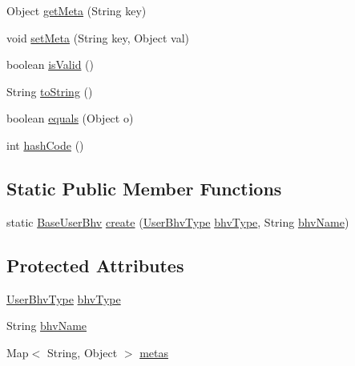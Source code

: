 \begin{DoxyCompactItemize}
\item 
\-Object \hyperlink{classlab_1_1davidahn_1_1appshuttle_1_1collect_1_1bhv_1_1_base_user_bhv_a084f908dad6936320d731dd78b77da02}{get\-Meta} (\-String key)
\item 
void \hyperlink{classlab_1_1davidahn_1_1appshuttle_1_1collect_1_1bhv_1_1_base_user_bhv_aa88c083a83fbd867da9f3ca5ef4ea007}{set\-Meta} (\-String key, \-Object val)
\item 
boolean \hyperlink{classlab_1_1davidahn_1_1appshuttle_1_1collect_1_1bhv_1_1_base_user_bhv_ab6813ac64ce1f0d009c892b5cac261d6}{is\-Valid} ()
\item 
\-String \hyperlink{classlab_1_1davidahn_1_1appshuttle_1_1collect_1_1bhv_1_1_base_user_bhv_a90459169f7d91b38afacf6daeb038c6b}{to\-String} ()
\item 
boolean \hyperlink{classlab_1_1davidahn_1_1appshuttle_1_1collect_1_1bhv_1_1_base_user_bhv_a842e471851fcc644832ca3f45eeb8994}{equals} (\-Object o)
\item 
int \hyperlink{classlab_1_1davidahn_1_1appshuttle_1_1collect_1_1bhv_1_1_base_user_bhv_a9025bf7cfb1aa4b4f12b5a82dc0b44b6}{hash\-Code} ()
\end{DoxyCompactItemize}
\subsection*{\-Static \-Public \-Member \-Functions}
\begin{DoxyCompactItemize}
\item 
static \hyperlink{classlab_1_1davidahn_1_1appshuttle_1_1collect_1_1bhv_1_1_base_user_bhv}{\-Base\-User\-Bhv} \hyperlink{classlab_1_1davidahn_1_1appshuttle_1_1collect_1_1bhv_1_1_base_user_bhv_a2b8ccb431e222ea8162e3ffaec88e5be}{create} (\hyperlink{enumlab_1_1davidahn_1_1appshuttle_1_1collect_1_1bhv_1_1_user_bhv_type}{\-User\-Bhv\-Type} \hyperlink{classlab_1_1davidahn_1_1appshuttle_1_1collect_1_1bhv_1_1_base_user_bhv_a29dae66ba4bf89a75849d77a35a57cb2}{bhv\-Type}, \-String \hyperlink{classlab_1_1davidahn_1_1appshuttle_1_1collect_1_1bhv_1_1_base_user_bhv_aa211c66df8abf7df665859d662891cc0}{bhv\-Name})
\end{DoxyCompactItemize}
\subsection*{\-Protected \-Attributes}
\begin{DoxyCompactItemize}
\item 
\hyperlink{enumlab_1_1davidahn_1_1appshuttle_1_1collect_1_1bhv_1_1_user_bhv_type}{\-User\-Bhv\-Type} \hyperlink{classlab_1_1davidahn_1_1appshuttle_1_1collect_1_1bhv_1_1_base_user_bhv_a29dae66ba4bf89a75849d77a35a57cb2}{bhv\-Type}
\item 
\-String \hyperlink{classlab_1_1davidahn_1_1appshuttle_1_1collect_1_1bhv_1_1_base_user_bhv_aa211c66df8abf7df665859d662891cc0}{bhv\-Name}
\item 
\-Map$<$ \-String, \-Object $>$ \hyperlink{classlab_1_1davidahn_1_1appshuttle_1_1collect_1_1bhv_1_1_base_user_bhv_ae79f5563e46ad25778555114ac80faff}{metas}
\end{DoxyCompactItemize}


